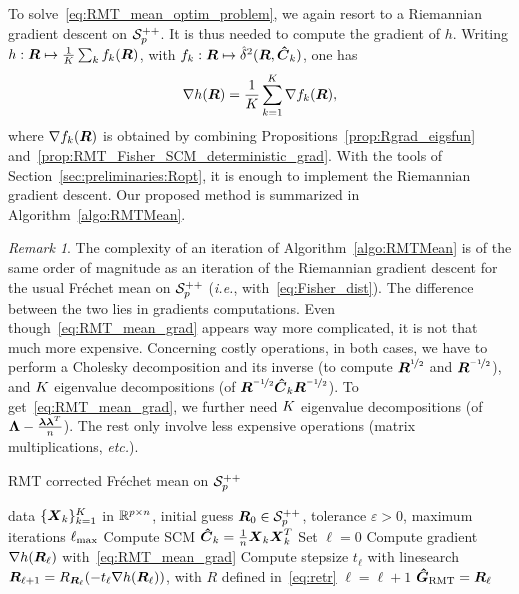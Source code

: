 \documentclass{article}
\theoremstyle{plain}
\theoremstyle{definition}
\theoremstyle{remark}
\newtheorem{remark}[theorem]{Remark}
\begin{document}
To solve~\eqref{eq:RMT_mean_optim_problem}, we again resort to a Riemannian gradient descent on $\mathcal{S}^{++}_{p}$.
It is thus needed to compute the gradient of $h$.
Writing $h:\boldsymbol{R}\mapsto\frac1{K}\sum_k f_k(\boldsymbol{R})$, with $f_k:\boldsymbol{R}\mapsto\hat{\delta}^2(\boldsymbol{R},\boldsymbol{\hat{C}}_k)$, one has
\begin{equation}
    \nabla h(\boldsymbol{R}) = \frac1{K} \sum_{k=1}^K \nabla f_k(\boldsymbol{R}),
\label{eq:RMT_mean_grad}
\end{equation}
where $\nabla f_k(\boldsymbol{R})$ is obtained by combining Propositions~\ref{prop:Rgrad_eigsfun} and~\ref{prop:RMT_Fisher_SCM_deterministic_grad}.
With the tools of Section~\ref{sec:preliminaries:Ropt}, it is enough to implement the Riemannian gradient descent.
Our proposed method is summarized in Algorithm~\ref{algo:RMTMean}.

\begin{remark}
    The complexity of an iteration of Algorithm~\ref{algo:RMTMean} is of the same order of magnitude as an iteration of the Riemannian gradient descent for the usual Fréchet mean on $\mathcal{S}^{++}_{p}$ (\emph{i.e.}, with~\eqref{eq:Fisher_dist}).
    The difference between the two lies in gradients computations.
    Even though~\eqref{eq:RMT_mean_grad} appears way more complicated, it is not that much more expensive.
    Concerning costly operations, in both cases, we have to perform a Cholesky decomposition and its inverse (to compute $\boldsymbol{R}^{\nicefrac12}$ and $\boldsymbol{R}^{\nicefrac{-1}2}$), and $K$ eigenvalue decompositions (of $\boldsymbol{R}^{\nicefrac{-1}2}\boldsymbol{\hat{C}}_k\boldsymbol{R}^{\nicefrac{-1}2}$).
    To get~\eqref{eq:RMT_mean_grad}, we further need $K$ eigenvalue decompositions (of $\boldsymbol{\Lambda}-\frac{\boldsymbol{\lambda}\boldsymbol{\lambda}^T}{n}$).
    The rest only involve less expensive operations (matrix multiplications, \emph{etc.}).
\end{remark}

\begin{algorithm}
    \caption{RMT corrected Fréchet mean on $\mathcal{S}^{++}_{p}$}
    \label{algo:RMTMean}
    \begin{algorithmic}
            data $\{\boldsymbol{X}_k\}_{k=1}^{K}$ in $\mathbb{R}^{p\times n}$,
            initial guess $\boldsymbol{R}_0\in\mathcal{S}^{++}_{p}$,
            tolerance $\varepsilon>0$,
            maximum iterations $\ell_{\textup{max}}$
        \STATE Compute SCM $\boldsymbol{\hat{C}}_k=\frac1{n}\boldsymbol{X}_k\boldsymbol{X}_k^T$
        \ENDFOR
        \STATE Set $\ell=0$
        \REPEAT
        \STATE Compute gradient $\nabla h(\boldsymbol{R}_{\ell})$ with~\eqref{eq:RMT_mean_grad}
        \STATE Compute stepsize $t_{\ell}$ with linesearch
        \STATE $\boldsymbol{R}_{\ell+1} = R_{\boldsymbol{R}_{\ell}}(-t_{\ell}\nabla h(\boldsymbol{R}_{\ell}))$, with $R$ defined in~\eqref{eq:retr}
        \STATE $\ell=\ell+1$
         $\boldsymbol{\hat{G}}_{\textup{RMT}}=\boldsymbol{R}_{\ell}$
    \end{algorithmic}
\end{algorithm}
\end{document}
